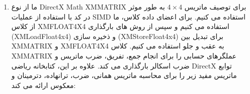 {\begin{spacing}{1.5}
\begin{enumerate}[label=\textbf{\arabic*}.]
            \item {ما از نوع DirectX Math XMMATRIX برای توصیف ماتریس $4\times 4$ به طور موثر در کد با استفاده از عملیات SIMD استفاده می کنیم.
            برای اعضای داده کلاس، ما از کلاس XMFLOAT4X4 استفاده می کنیم و
            سپس از روش های بارگذاری (XMLoadFloat4x4) و ذخیره سازی (XMStoreFloat4x4) برای تبدیل بین XMMATRIX و XMFLOAT4X4 به عقب و جلو استفاده می کنیم.
            کلاس XMMATRIX عملگرهای حسابی را برای انجام جمع، تفریق، ضرب ماتریس و ضرب اسکالر بارگذاری می کند.
            علاوه بر این، کتابخانه ریاضی DirectX توابع ماتریس مفید زیر را برای محاسبه ماتریس همانی، ضرب، ترانهاده، دترمینان و معکوس ارائه می کند:
            \textbf{\vspace{6pt}}
            \lr{}
            }
        \end{enumerate}
    \end{spacing}
}
\newpage


